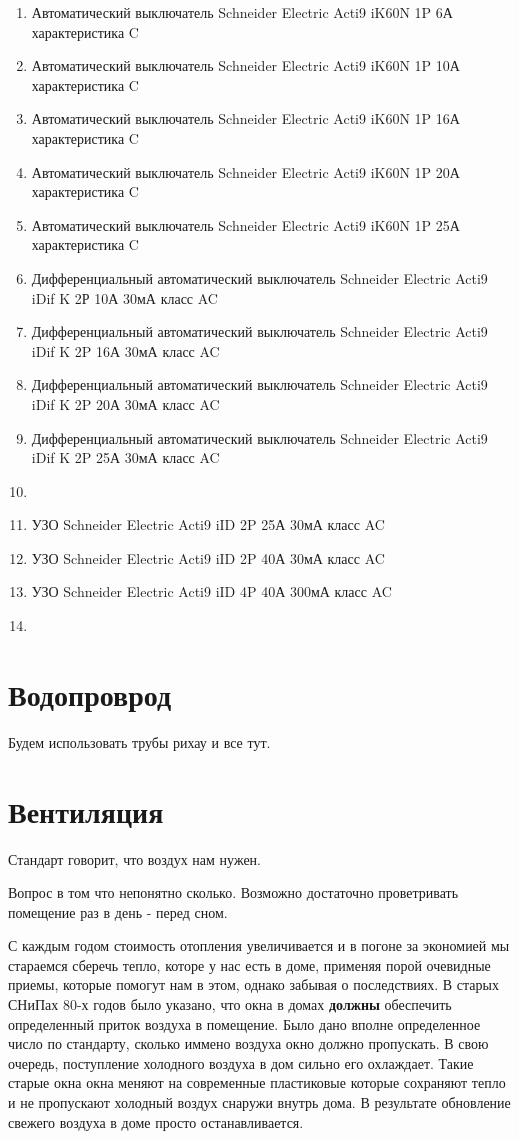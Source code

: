 \documentclass[10pt, twocolumn]{report}
\begin{document}
\begin{enumerate}
\item Автоматический выключатель Schneider Electric Acti9 iK60N 1P 6А характеристика C
\item Автоматический выключатель Schneider Electric Acti9 iK60N 1P 10А характеристика C
\item Автоматический выключатель Schneider Electric Acti9 iK60N 1P 16А характеристика C
\item Автоматический выключатель Schneider Electric Acti9 iK60N 1P 20А характеристика C
\item Автоматический выключатель Schneider Electric Acti9 iK60N 1P 25А характеристика C
\item Дифференциальный автоматический выключатель Schneider Electric Acti9 iDif K 2Р 10А 30мА класс AC
\item Дифференциальный автоматический выключатель Schneider Electric Acti9 iDif K 2P 16А 30мА класс AC
\item Дифференциальный автоматический выключатель Schneider Electric Acti9 iDif K 2P 20А 30мА класс AC
\item Дифференциальный автоматический выключатель Schneider Electric Acti9 iDif K 2P 25А 30мА класс AC
\item 
\item УЗО Schneider Electric Acti9 iID 2P 25А 30мА класс AC
\item УЗО Schneider Electric Acti9 iID 2P 40А 30мА класс AC
\item УЗО Schneider Electric Acti9 iID 4P 40А 300мА класс AC
\item 
\end{enumerate}

\chapter{Водопроврод}
Будем использовать трубы рихау и все тут.

\chapter{Вентиляция}
Стандарт говорит, что воздух нам нужен.

Вопрос в том что непонятно сколько. Возможно достаточно проветривать помещение раз в день - перед сном.

С каждым годом стоимость отопления увеличивается и в погоне за экономией мы стараемся сберечь тепло, которе у нас есть в доме, применяя порой очевидные приемы, которые помогут нам в этом, однако забывая о последствиях. В старых СНиПах 80-х годов было указано, что окна в домах \textbf{должны} обеспечить определенный приток воздуха в помещение. Было дано вполне определенное число по стандарту, сколько иммено воздуха окно должно пропускать. В свою очередь, поступление холодного воздуха в дом сильно его охлаждает. Такие старые окна окна меняют на современные пластиковые которые сохраняют тепло и не пропускают холодный воздух снаружи внутрь дома. В результате обновление свежего воздуха в доме просто останавливается. 
\end{document}
